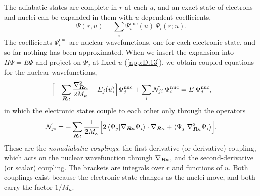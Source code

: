 The adiabatic states are complete in $r$ at each $u$, and an exact state of electrons and nuclei can be expanded in them with $u$-dependent coefficients,
\begin{equation*}
  \Psi(r,u) = \sum_i\Psi^{\mathrm{nuc}}_i(u)\,\Psi_i(r;u) .
\end{equation*}
The coefficients $\Psi^{\mathrm{nuc}}_i$ are nuclear wavefunctions, one for each electronic state, and so far nothing has been approximated. When we insert the expansion into $H\Psi = E\Psi$ and project on $\Psi_j$ at fixed $u$ (\cref{app:D.13}), we obtain coupled equations for the nuclear wavefunctions,
\begin{equation}
  \Bigl[-\sum_{\bm{R}\kappa}\frac{\nabla_{\bm{R}\kappa}^2}{2M_\kappa} + E_j(u)\Bigr]\Psi^{\mathrm{nuc}}_j + \sum_i\mathcal{N}_{ji}\,\Psi^{\mathrm{nuc}}_i = E\,\Psi^{\mathrm{nuc}}_j ,
  \label{eq:5.1-coupled}
\end{equation}
in which the electronic states couple to each other only through the operators
\begin{equation}
  \mathcal{N}_{ji} = -\sum_{\bm{R}\kappa}\frac{1}{2M_\kappa}\Bigl[2\,\langle\Psi_j|\nabla_{\bm{R}\kappa}\Psi_i\rangle\cdot\nabla_{\bm{R}\kappa} + \langle\Psi_j|\nabla_{\bm{R}\kappa}^2\Psi_i\rangle\Bigr] .
  \label{eq:5.1-N}
\end{equation}
These are the \emph{nonadiabatic couplings}: the first-derivative (or derivative) coupling, which acts on the nuclear wavefunction through $\nabla_{\bm{R}\kappa}$, and the second-derivative (or scalar) coupling. The brackets are integrals over $r$ and functions of $u$. Both couplings exist because the electronic state changes as the nuclei move, and both carry the factor $1/M_\kappa$.


